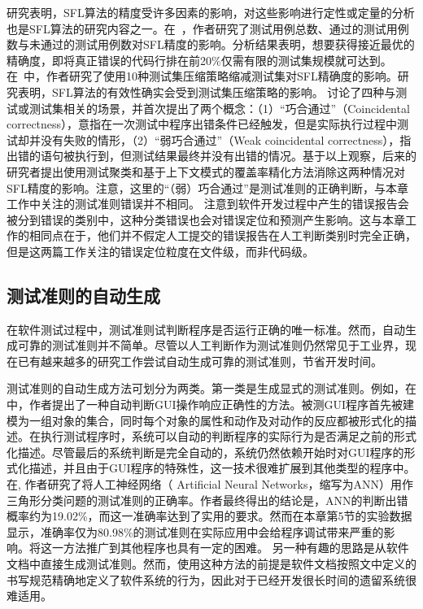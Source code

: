 研究表明，SFL算法的精度受许多因素的影响，对这些影响进行定性或定量的分析也是SFL算法的研究内容之一。在~\cite{Abreu20091780}，作者研究了测试用例总数、通过的测试用例数与未通过的测试用例数对SFL精度的影响。分析结果表明，想要获得接近最优的精确度，即将真正错误的代码行排在前20\%仅需有限的测试集规模就可达到。在~\cite{Yu:2008:ESE:1368088.1368116}中，作者研究了使用10种测试集压缩策略缩减测试集对SFL精确度的影响。研究表明，SFL算法的有效性确实会受到测试集压缩策略的影响。
\cite{Masri:2009:ESF:1555860.1555862}讨论了四种与测试或测试集相关的场景，并首次提出了两个概念：（1）“巧合通过”（Coincidental correctness），意指在一次测试中程序出错条件已经触发，但是实际执行过程中测试却并没有失败的情形，（2）“弱巧合通过”（Weak coincidental correctness），指出错的语句被执行到，但测试结果最终并没有出错的情况。基于以上观察，后来的研究者提出使用测试聚类\cite{5477086}\cite{Masri:2014:PCC:2582050.2559932}和基于上下文模式的覆盖率精化方法\cite{Wang:2009:TCC:1555001.1555022}消除这两种情况对SFL精度的影响。注意，这里的“（弱）巧合通过”是测试准则的正确判断，与本章工作中关注的测试准则错误并不相同。
\cite{Kochhar:2014:BFM:2597073.2597105}\cite{Herzig:2013:IBI:2486788.2486840}注意到软件开发过程中产生的错误报告会被分到错误的类别中，这种分类错误也会对错误定位和预测产生影响。这与本章工作的相同点在于，他们并不假定人工提交的错误报告在人工判断类别时完全正确，但是这两篇工作关注的错误定位粒度在文件级，而非代码级。

\subsection{测试准则的自动生成}

在软件测试过程中，测试准则试判断程序是否运行正确的唯一标准。然而，自动生成可靠的测试准则并不简单。尽管以人工判断作为测试准则仍然常见于工业界，现在已有越来越多的研究工作尝试自动生成可靠的测试准则，节省开发时间。

测试准则的自动生成方法可划分为两类。第一类是生成显式的测试准则。例如，在\cite{Memon:2000:ATO:357474.355050}中，作者提出了一种自动判断GUI操作响应正确性的方法。被测GUI程序首先被建模为一组对象的集合，同时每个对象的属性和动作及对动作的反应都被形式化的描述。在执行测试程序时，系统可以自动的判断程序的实际行为是否满足之前的形式化描述。尽管最后的系统判断是完全自动的，系统仍然依赖开始时对GUI程序的形式化描述，并且由于GUI程序的特殊性，这一技术很难扩展到其他类型的程序中。
在\cite{Aggarwal:2004:NNB:986710.986725}, 作者研究了将人工神经网络（ Artificial Neural Networks，缩写为ANN）用作三角形分类问题的测试准则的正确率。作者最终得出的结论是，ANN的判断出错概率约为19.02\%，而这一准确率达到了实用的要求。然而在本章第5节的实验数据显示，准确率仅为80.98\%的测试准则在实际应用中会给程序调试带来严重的影响。将这一方法推广到其他程序也具有一定的困难。
另一种有趣的思路是从软件文档中直接生成测试准则\cite{667877-documentation}。然而，使用这种方法的前提是软件文档按照文中定义的书写规范精确地定义了软件系统的行为，因此对于已经开发很长时间的遗留系统很难适用。

